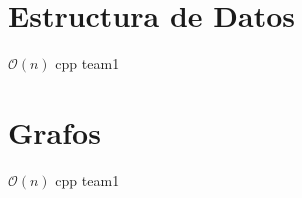 \section{Estructura de Datos}

{}
{$\mathcal{O}(n)$}
{cpp}{}
{team1}


\section{Grafos}

{}
{$\mathcal{O}(n)$}
{cpp}{}
{team1}
